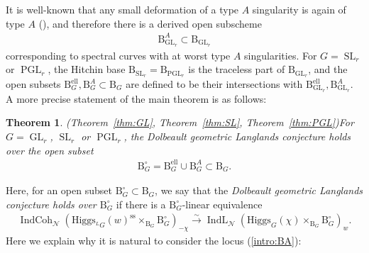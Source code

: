 \documentclass[11pt,oneside,a4paper,mathscr]{amsart}
\newtheorem{thm}{Theorem}[section]
\theoremstyle{definition}
\newcommand{\rB}{\mathrm{B}}
\newcommand{\IndCoh}{\operatorname{IndCoh}}
\newcommand{\IndL}{\operatorname{IndL}}
\newcommand{\GL}{\operatorname{GL}}
\newcommand{\SL}{\operatorname{SL}}
\newcommand{\PGL}{\operatorname{PGL}}
\newcommand{\Hig}{\mathrm{Higgs}}
\begin{document}
It is well-known that any small deformation of a type $A$ singularity is again of type $A$ (\cite[Theorem~1.2.48, Corollary~1.2.49]{GreuelLossenShustin}), and therefore there is a derived open subscheme 
\begin{align}\label{intro:BA}
\rB_{\GL_r}^A \subset \rB_{\GL_r}
\end{align}
corresponding to spectral curves
with at worst type $A$ singularities. 
For $G=\SL_r$ or $\PGL_r$, the Hitchin base
$\rB_{\SL_r}=\rB_{\PGL_r}$ is the traceless part of $\rB_{\GL_r}$, and the open subsets
$\rB_G^{\mathrm{ell}}, \rB_G^A \subset \rB_G$ are defined to be their intersections with $\rB_{\GL_r}^{\mathrm{ell}}, \rB_{\GL_r}^A$. 
A more precise statement of the main theorem is as follows: 
\begin{thm}\emph{(Theorem~\ref{thm:GL}, Theorem~\ref{thm:SL}, Theorem~\ref{thm:PGL})}\label{intro:mainthm}
    For $G=\GL_r$, $\SL_r$ or $\PGL_r$, the Dolbeault geometric Langlands conjecture holds over the open subset 
    \begin{align*}
        \rB_G^{\circ}=\rB_{G}^{\mathrm{ell}} \cup \rB_G^A \subset \rB_G.
    \end{align*}
\end{thm}

Here, for an open subset $\rB_G^{\circ} \subset \rB_G$, we say that the
\textit{Dolbeault geometric Langlands conjecture holds over $\rB_G^{\circ}$}
if there is a $\rB_G^{\circ}$-linear equivalence 
\begin{align}\label{intro:IndL2}
        \IndCoh_{\mathcal{N}}(\Hig_{{}^{L}G}(w)^{\mathrm{ss}}\times_{\rB_G}\rB_G^{\circ})_{-\chi}
        \stackrel{\sim}{\to}
        \IndL_{\mathcal{N}}(\Hig_G(\chi)\times_{\rB_G}\rB_G^{\circ})_w.
\end{align}
Here we explain why it is natural to consider the locus (\ref{intro:BA}):
\end{document}
